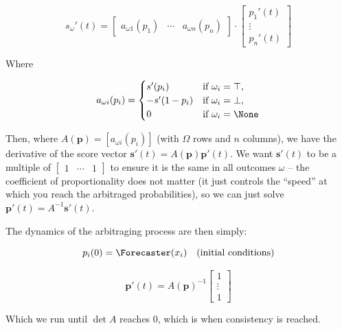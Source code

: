 \begin{equation*}
    s_\omega'(t)=
\begin{bmatrix}
    a_{\omega 1}(p_1) & \cdots & a_{\omega n}(p_n)
\end{bmatrix}
    \cdot
\begin{bmatrix}
    p_1'(t) \\
    \vdots \\
    p_n'(t)
\end{bmatrix}
\end{equation*}

Where

\begin{equation*}
a_{\omega i}(p_i) =
\begin{cases}
    s'(p_i) & \text{if } \omega_i = \top, \\
    -s'(1 - p_i) & \text{if } \omega_i = \bot, \\
    0 & \text{if } \omega_i = \None
\end{cases}
\end{equation*}

Then, where $A(\mathbf{p})=[a_{\omega i}(p_i)]$ (with $\Omega$ rows and $n$ columns), we have the derivative of the score vector $\mathbf{s}'(t)=A(\mathbf{p})\mathbf{p}'(t)$. We want $\mathbf{s}'(t)$ to be a multiple of $\begin{bmatrix}1 & \cdots & 1\end{bmatrix}$ to ensure it is the same in all outcomes $\omega$ -- the coefficient of proportionality does not matter (it just controls the ``speed'' at which you reach the arbitraged probabilities), so we can just solve $\mathbf{p}'(t)=A^{-1}\mathbf{s}'(t)$.

The dynamics of the arbitraging process are then simply:

\begin{equation*}
p_i(0) = \Forecaster(x_i)\quad\text{(initial conditions)}
\end{equation*}

\begin{equation*}
\mathbf{p}'(t) = A(\mathbf{p})^{-1}\begin{bmatrix}
    1 \\ \vdots \\ 1
\end{bmatrix}
\end{equation*}

Which we run until $\det A$ reaches 0, which is when consistency is reached.


